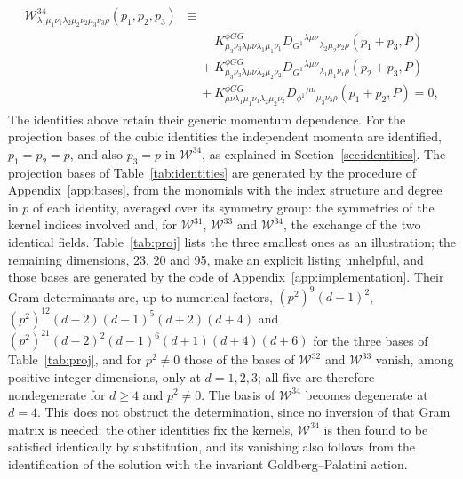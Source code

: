 \documentclass[prd,aps,preprint,nofootinbib,amsmath,amssymb,eqsecnum]{revtex4-2}
\newcommand{\W}{\mathcal{W}}
\begin{document}
\begin{align}
\begin{split}
\end{split}\\
\begin{split}
\W^{34}_{\lambda_1\mu_1\nu_1\lambda_2\mu_2\nu_2\mu_3\nu_3\rho}(p_1,p_2,p_3)&\equiv\\
&\quad\phantom{+}K^{\phi GG}_{\mu_3\nu_3\lambda\mu\nu\lambda_1\mu_1\nu_1}D_{G^1}{}^{\lambda\mu\nu}{}_{\lambda_2\mu_2\nu_2\rho}(p_1+p_3,P)\\
&\quad+K^{\phi GG}_{\mu_3\nu_3\lambda\mu\nu\lambda_2\mu_2\nu_2}D_{G^1}{}^{\lambda\mu\nu}{}_{\lambda_1\mu_1\nu_1\rho}(p_2+p_3,P)\\
&\quad+K^{\phi GG}_{\mu\nu\lambda_1\mu_1\nu_1\lambda_2\mu_2\nu_2}D_{\phi^1}{}^{\mu\nu}{}_{\mu_3\nu_3\rho}(p_1+p_2,P)=0,
\end{split}
\end{align}
The identities above retain their generic momentum dependence. For the projection bases
of the cubic identities the independent momenta are identified, $p_1=p_2=p$, and also
$p_3=p$ in $\W^{34}$, as explained in Section~\ref{sec:identities}. The projection bases of
Table~\ref{tab:identities} are generated by the procedure of Appendix~\ref{app:bases}, from
the monomials with the index structure and degree in $p$ of each identity, averaged over its
symmetry group: the symmetries of the kernel indices involved
and, for $\W^{31}$, $\W^{33}$ and $\W^{34}$, the exchange of the two identical fields.
Table~\ref{tab:proj} lists the three smallest ones as an illustration; the remaining
dimensions, 23, 20 and 95, make an explicit listing unhelpful, and those bases are generated
by the code of Appendix~\ref{app:implementation}. Their Gram determinants are, up to
numerical factors, $(p^2)^9(d-1)^2$, $(p^2)^{12}(d-2)(d-1)^5(d+2)(d+4)$ and
$(p^2)^{21}(d-2)^2(d-1)^6(d+1)(d+4)(d+6)$ for the three bases of Table~\ref{tab:proj}, and
for $p^2\neq0$ those of the bases of $\W^{32}$ and $\W^{33}$ vanish, among positive
integer dimensions, only at $d=1,2,3$; all five are therefore nondegenerate for $d\geq4$ and
$p^2\neq0$. The basis of $\W^{34}$ becomes degenerate at $d=4$. This does not obstruct the
determination, since no inversion of that Gram matrix is needed: the other identities fix
the kernels, $\W^{34}$ is then found to be satisfied identically by substitution, and its
vanishing also follows from the identification of the solution with the invariant
Goldberg--Palatini action.
\end{document}
